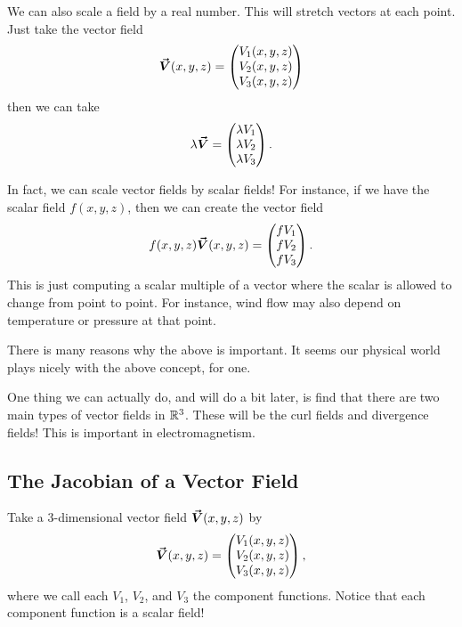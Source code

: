         We can also scale a field by a real number.  This will stretch vectors at each point.  Just take the vector field
        \[
        \boldsymbol{\vec{V}}(x,y,z)=\begin{pmatrix} V_1(x,y,z) \\ V_2(x,y,z) \\ V_3(x,y,z)\end{pmatrix}
        \]
        then we can take
        \[
        \lambda \boldsymbol{\vec{V}}=\begin{pmatrix} \lambda V_1\\ \lambda V_2\\ \lambda V_3\end{pmatrix}.
        \]
        
        In fact, we can scale vector fields by scalar fields! For instance, if we have the scalar field $f(x,y,z)$, then we can create the vector field
        \[
        f(x,y,z) \boldsymbol{\vec{V}}(x,y,z) = \begin{pmatrix} fV_1 \\ fV_2 \\ fV_3 \end{pmatrix}.
        \]
       This is just computing a scalar multiple of a vector where the scalar is allowed to change from point to point.  For instance, wind flow may also depend on temperature or pressure at that point.
        
        \begin{remark}
        There is many reasons why the above is important.  It seems our physical world plays nicely with the above concept, for one.
        
        One thing we can actually do, and will do a bit later, is find that there are two main types of vector fields in $\mathbb{R}^3$.  These will be the curl fields and divergence fields!  This is important in electromagnetism.
        \end{remark}		        
		        

		        \subsection{The Jacobian of a Vector Field}
		        Take a 3-dimensional vector field $\boldsymbol{\vec{V}}(x,y,z)$ by
		        \[
		        \boldsymbol{\vec{V}}(x,y,z)=\begin{pmatrix} V_1(x,y,z) \\ V_2(x,y,z) \\ V_3(x,y,z)\end{pmatrix},
		        \]
		        where we call each $V_1$, $V_2$, and $V_3$ the component functions.  Notice that each component function is a scalar field!
		        
